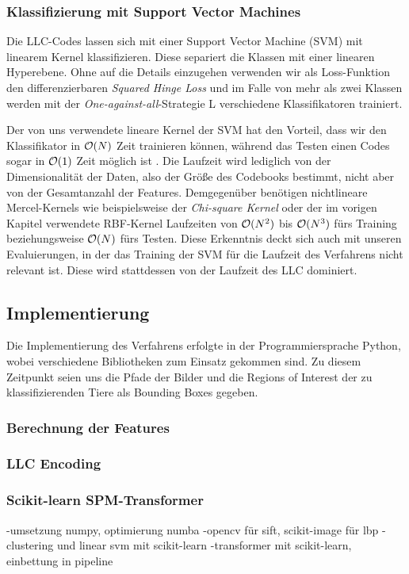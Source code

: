 \subsubsection{Klassifizierung mit Support Vector Machines}

Die LLC-Codes lassen sich mit einer Support Vector Machine (SVM) mit linearem Kernel klassifizieren. Diese separiert die Klassen mit einer linearen Hyperebene. Ohne auf die Details einzugehen verwenden wir als Loss-Funktion den differenzierbaren \emph{Squared Hinge Loss} und im Falle von mehr als zwei Klassen werden mit der \emph{One-against-all}-Strategie L verschiedene Klassifikatoren trainiert.

Der von uns verwendete lineare Kernel der SVM hat den Vorteil, dass wir den Klassifikator in $\mathcal{O}(N)$ Zeit trainieren können, während das Testen einen Codes sogar in $\mathcal{O}(1)$ Zeit möglich ist \cite{yygh09}. Die Laufzeit wird lediglich von der Dimensionalität der Daten, also der Größe des Codebooks bestimmt, nicht aber von der Gesamtanzahl der Features. Demgegenüber benötigen nichtlineare Mercel-Kernels wie beispielsweise der \emph{Chi-square Kernel} oder der im vorigen Kapitel verwendete RBF-Kernel Laufzeiten von $\mathcal{O}(N^2)$ bis $\mathcal{O}(N^3)$ fürs Training beziehungsweise $\mathcal{O}(N)$ fürs Testen. Diese Erkenntnis deckt sich auch mit unseren Evaluierungen, in der das Training der SVM für die Laufzeit des Verfahrens nicht relevant ist. Diese wird stattdessen von der Laufzeit des LLC dominiert.

\subsection{Implementierung}

Die Implementierung des Verfahrens erfolgte in der Programmiersprache Python, wobei verschiedene Bibliotheken zum Einsatz gekommen sind. Zu diesem Zeitpunkt seien uns die Pfade der Bilder und die Regions of Interest der zu klassifizierenden Tiere als Bounding Boxes gegeben.

\subsubsection{Berechnung der Features}



\subsubsection{LLC Encoding}



\subsubsection{Scikit-learn SPM-Transformer}



-umsetzung numpy, optimierung numba
-opencv für sift, scikit-image für lbp
-clustering und linear svm mit scikit-learn
-transformer mit scikit-learn, einbettung in pipeline
